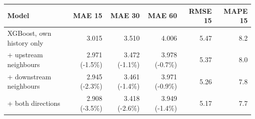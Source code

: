 \begin{tabular}{@{}lrrrrr@{}}
\toprule
Model & MAE 15 & MAE 30 & MAE 60 & RMSE 15 & MAPE 15 \\
\midrule
XGBoost, own history only & 3.015 & 3.510 & 4.006 & 5.47 & 8.2 \\
+ upstream neighbours & 2.971 (-1.5\%) & 3.472 (-1.1\%) & 3.978 (-0.7\%) & 5.37 & 8.0 \\
+ downstream neighbours & 2.945 (-2.3\%) & 3.461 (-1.4\%) & 3.971 (-0.9\%) & 5.26 & 7.8 \\
+ both directions & 2.908 (-3.5\%) & 3.418 (-2.6\%) & 3.949 (-1.4\%) & 5.17 & 7.7 \\
\bottomrule
\end{tabular}

